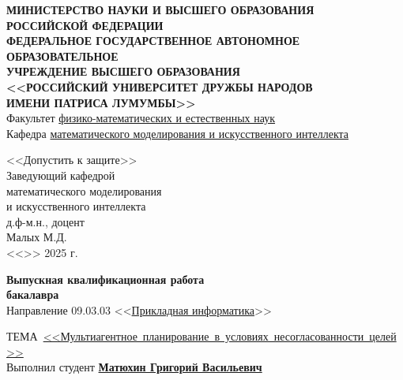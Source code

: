 

\begin{titlepage}

  \begin{center}
    \hfill \break
    \small
    \textbf{
      МИНИСТЕРСТВО НАУКИ И ВЫСШЕГО ОБРАЗОВАНИЯ\\
      РОССИЙСКОЙ ФЕДЕРАЦИИ\\
      ФЕДЕРАЛЬНОЕ ГОСУДАРСТВЕННОЕ АВТОНОМНОЕ ОБРАЗОВАТЕЛЬНОЕ\\
      УЧРЕЖДЕНИЕ ВЫСШЕГО ОБРАЗОВАНИЯ\\
      <<РОССИЙСКИЙ УНИВЕРСИТЕТ ДРУЖБЫ НАРОДОВ\\
      ИМЕНИ ПАТРИСА ЛУМУМБЫ>>
    }\\
    \normalsize
    Факультет \underline{физико-математических и естественных наук}\\ 
    Кафедра \underline{математического моделирования и искусственного интеллекта}

    \vspace*{\fill}

    \begin{flushright}
      <<Допустить к защите>>\\
      Заведующий кафедрой\\
      математического моделирования\\и искусственного интеллекта\\
      д.ф-м.н., доцент\\
      \underline{\phantom{signature signa}} Малых М.Д.\\
      <<\underline{\phantom{day}}>> \underline{\phantom{month month}} 2025 г.
    \end{flushright}
   
    \vspace*{\fill}
    \Large{\textbf{Выпускная квалификационная работа\\ бакалавра}}
    \\
    \normalsize
    Направление  09.03.03 <<\underline{Прикладная информатика}>>
  \end{center}

  \vspace*{\fill}

  \begin{justify}
    \mbox{ТЕМА \uline{<<Мультиагентное планирование в условиях несогласованности целей>>}} \\
    Выполнил студент \underline{\textbf{Матюхин Григорий Васильевич}}
  \end{justify}


\end{titlepage}
